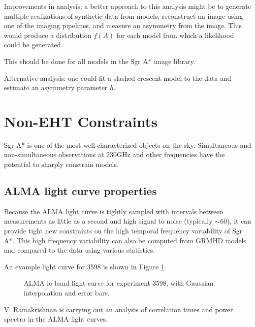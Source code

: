 \documentclass[twocolumn,tighten,dvipsnames]{aastex63}
\newcommand\<{{\langle}}
\renewcommand\>{{\rangle}} %
\begin{document}
Improvements in analysis: a better approach to this analysis might be to generate multiple realizations of synthetic data from models, reconstruct an image using one of the imaging pipelines, and measure an asymmetry from the image.  This would produce a distribution $f(A)$ for each model from which a likelihood could be generated.

This should be done for all models in the Sgr A* image library.

Alternative analysis: one could fit a slashed crescent model to the data and estimate an asymmetry parameter $h$.

\section{Non-EHT Constraints}
\label{sec:nonehtconst}

Sgr A* is one of the most well-characterized objects on the sky. Simultaneous and non-simultaneous observations at $230$GHz and  other frequencies have the potential to sharply constrain models.

\subsection{ALMA light curve properties}
\label{sec:lcconst}

Because the ALMA light curve is tightly sampled with intervals  between measurements as little as a second and high signal to noise (typically $\sim 60$), it can provide tight new constraints on the high temporal frequency variability of Sgr A*.  This high frequency variability can also be computed from GRMHD models and compared to the data using various statistics.

An example light curve for 3598 is shown in Figure \ref{fig:LC3598}.

\begin{figure}
    \centering
    \caption{ALMA lo band light curve for experiment 3598, with Gaussian interpolation and error bars.}
    \label{fig:LC3598}
\end{figure}

V. Ramakrishnan is carrying out an analysis of correlation times and power spectra in the ALMA light curves.
\end{document}
